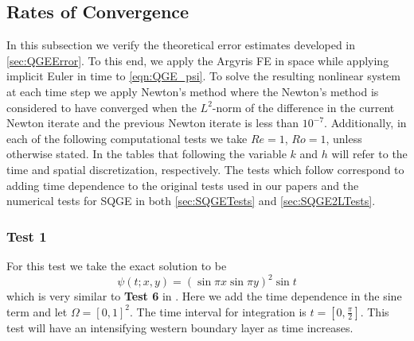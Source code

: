\subsection{Rates of Convergence}
In this subsection we verify the theoretical error estimates developed in
\autoref{sec:QGEError}. To this end, we apply the Argyris FE in space while
applying implicit Euler in time to \eqref{eqn:QGE_psi}. To solve the resulting
nonlinear system at each time step we apply Newton's method where the Newton's
method is considered to have converged when the $L^2$-norm of the difference in
the current Newton iterate and the previous Newton iterate is less than
$10^{-7}$. Additionally, in each of the following computational tests we take
$Re = 1$, $Ro = 1$, unless otherwise stated. In the tables that following the
variable $k$ and $h$ will refer to the time and spatial discretization,
respectively. The tests which follow correspond to adding time dependence to the
original tests used in our papers \cite{Foster,Foster2L} and the numerical tests
for SQGE in both \autoref{sec:SQGETests} and \autoref{sec:SQGE2LTests}.

\subsubsection*{Test 1}
For this test we take the exact solution to be
\begin{equation}
  \psi(t;x,y) = \left(\sin \pi x \sin \pi y\right)^2 \sin t
  \label{eqn:Test1}
\end{equation}
which is very similar to \textbf{Test 6} in \cite{Foster}. Here we add the time
dependence in the sine term and let $\Omega = [0,1]^2$. The time interval for
integration is $t = [0,\frac{\pi}{2}]$. This test will have an intensifying
western boundary layer as time increases.

